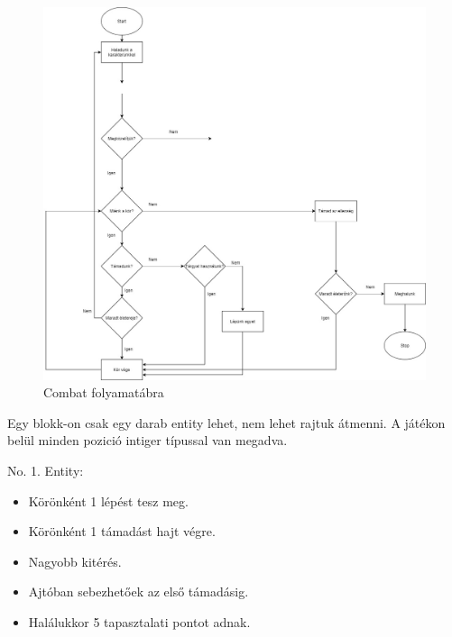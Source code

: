 
\begin{figure}[h!]
	\centering
	\includegraphics[width=\textwidth]{images/image5.png}
	\caption{Combat folyamatábra}
	\label{fig:combat2}
\end{figure}


Egy blokk-on csak egy darab entity lehet, nem lehet rajtuk átmenni.
A játékon belül minden pozició intiger típussal van megadva.



\noindent No. 1. Entity:
\begin{itemize}
    \item Körönként 1 lépést tesz meg.
    \item Körönként 1 támadást hajt végre.
    \item Nagyobb kitérés.
    \item Ajtóban sebezhetőek az első támadásig.
    \item Halálukkor 5 tapasztalati pontot adnak.
\end{itemize}

